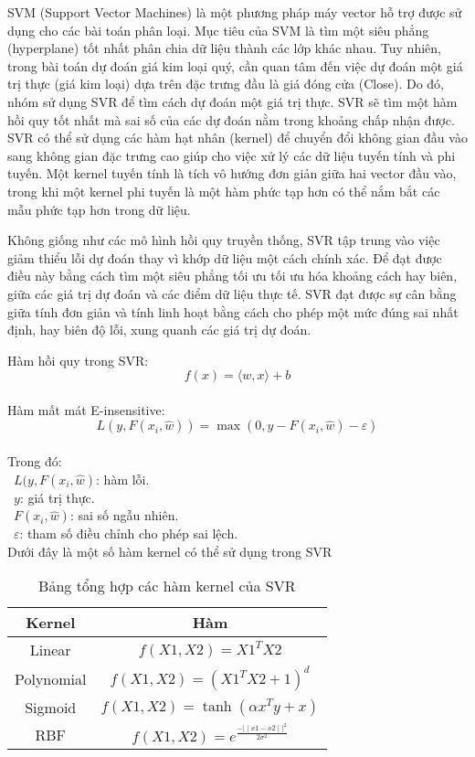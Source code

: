 SVM (Support Vector Machines) là một phương pháp máy vector hỗ trợ được sử dụng cho các bài toán phân loại. Mục tiêu của SVM là tìm một siêu phẳng (hyperplane) tốt nhất phân chia dữ liệu thành các lớp khác nhau. Tuy nhiên, trong bài toán dự đoán giá kim loại quý, cần quan tâm đến việc dự đoán một giá trị thực (giá kim loại) dựa trên đặc trưng đầu là giá đóng cửa (Close). Do đó, nhóm sử dụng SVR để tìm cách dự đoán một giá trị thực. SVR sẽ tìm một hàm hồi quy tốt nhất mà sai số của các dự đoán nằm trong khoảng chấp nhận được. SVR có thể sử dụng các hàm hạt nhân (kernel) để chuyển đổi không gian đầu vào sang không gian đặc trưng cao giúp cho việc xử lý các dữ liệu tuyến tính và phi tuyến. Một kernel tuyến tính là tích vô hướng đơn giản giữa hai vector đầu vào, trong khi một kernel phi tuyến là một hàm phức tạp hơn có thể nắm bắt các mẫu phức tạp hơn trong dữ liệu. 

Không giống như các mô hình hồi quy truyền thống, SVR tập trung vào việc giảm thiểu lỗi dự đoán thay vì khớp dữ liệu một cách chính xác. Để đạt được điều này bằng cách tìm một siêu phẳng tối ưu tối ưu hóa khoảng cách hay biên, giữa các giá trị dự đoán và các điểm dữ liệu thực tế. SVR đạt được sự cân bằng giữa tính đơn giản và tính linh hoạt bằng cách cho phép một mức đúng sai nhất định, hay biên độ lỗi, xung quanh các giá trị dự đoán.


Hàm hồi quy trong SVR:
\[
f(x) = \langle w, x \rangle + b
\]\\
Hàm mất mát E-insensitive:
\[
L(y, F(x_i, \hat{w})) = \max(0, y - F(x_i, \hat{w}) - \varepsilon)
\]\\
Trong đó:\\
    \indent\textbullet\ \(L(y,F(x_i,\hat{w})\): hàm lỗi.\\
    \indent\textbullet\ \(y\): giá trị thực.\\
    \indent\textbullet\ \(F(x_i,\hat{w})\): sai số ngẫu nhiên.\\
    \indent\textbullet\ \(\varepsilon\): tham số điều chỉnh cho phép sai lệch.\\
Dưới đây là một số hàm kernel có thể sử dụng trong SVR
\begin{table}[htbp]
  \centering
\begin{tabular}{|c|c|}
    \hline
     Kernel& Hàm\\ \hline
     Linear &  $f(X1,X2)=X1^TX2$\\ \hline
     Polynomial & $f(X1,X2)=(X1^TX2 +1)^d$ \\ \hline
     Sigmoid &  $f(X1,X2)=\tanh(\alpha x^{T}y+x)$\\ \hline
     RBF &  $f(X1,X2)=e^{\frac{-{\mid\mid x1-x2 \mid\mid}^2}{2\sigma^2}}$\\ \hline
\end{tabular}
\caption{Bảng tổng hợp các hàm kernel của SVR}
\end{table}

